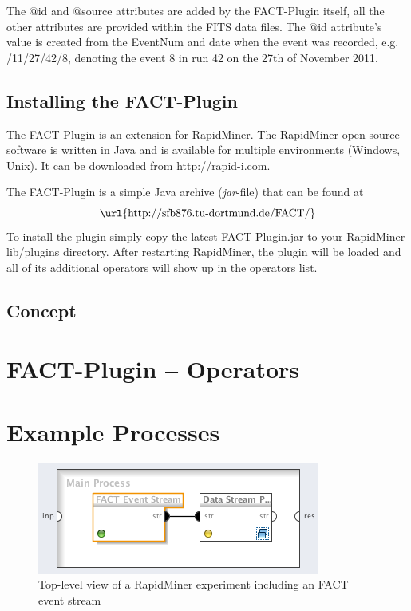 The {\ttfamily @id} and {\ttfamily @source} attributes are added by
the FACT-Plugin itself, all the other attributes are provided within
the FITS data files. The {\ttfamily @id} attribute's value is created
from the {\ttfamily EventNum} and date when the event was recorded,
e.g. {/11/27/42/8}, denoting the event 8 in run 42 on
the 27th of November 2011.



\subsection*{Installing the FACT-Plugin}
The FACT-Plugin is an extension for RapidMiner. The RapidMiner
open-source software is written in Java and is available for multiple
environments (Windows, Unix). It can be downloaded from
\url{http://rapid-i.com}.

The FACT-Plugin is a simple Java archive ({\em jar}-file) that can be
found at
\begin{displaymath}
 \mbox{\url{http://sfb876.tu-dortmund.de/FACT/}}
\end{displaymath}
To install the plugin simply copy the latest {\ttfamily FACT-Plugin.jar}
to your RapidMiner {\ttfamily lib/plugins} directory. After restarting
RapidMiner, the plugin will be loaded and all of its additional operators
will show up in the operators list.




\subsection{Concept}



\section{\label{sec:operators}FACT-Plugin -- Operators}


\section{\label{sec:examples}Example Processes}

\begin{figure}[h!]
  \begin{center}
    \includegraphics[scale=0.6]{event-stream-process}
  \end{center}
\caption{\label{fig:event-stream-process}Top-level view of a RapidMiner experiment including an FACT event stream}
\end{figure}